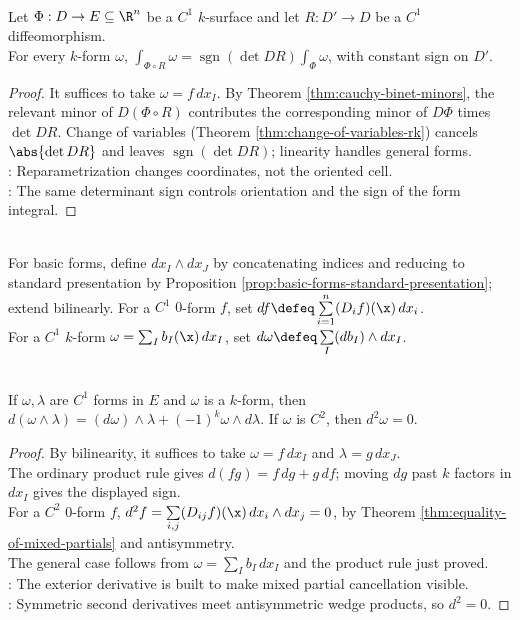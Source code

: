 \begin{theorem} \label{thm:forms-reparametrization-naturality} \\
Let $\Phi:D\to E\subseteq\R^n$ be a $C^1$ $k$-surface and let $R:D'\to D$ be a $C^1$ diffeomorphism.\\
For every $k$-form $\omega$, $\int_{\Phi\circ R}\omega=\operatorname{sgn}(\det DR)\int_{\Phi}\omega$, with constant sign on $D'$.
\begin{proof}
It suffices to take $\omega=f\,dx_I$. By Theorem \ref{thm:cauchy-binet-minors}, the relevant minor of $D(\Phi\circ R)$ contributes the corresponding minor of $D\Phi$ times $\det DR$. Change of variables (Theorem \ref{thm:change-of-variables-rk}) cancels $\abs{\det DR}$ and leaves $\operatorname{sgn}(\det DR)$; linearity handles general forms.\\
: Reparametrization changes coordinates, not the oriented cell.\\
: The same determinant sign controls orientation and the sign of the form integral.
\end{proof}
\end{theorem}

\begin{definition} \label{def:wedge-product-and-exterior-derivative} \\
For basic forms, define $dx_I\wedge dx_J$ by concatenating indices and reducing to standard presentation by Proposition \ref{prop:basic-forms-standard-presentation}; extend bilinearly. For a $C^1$ $0$-form $f$, set $df\defeq\sum\limits_{i=1}^{n}(D_if)(\x)\,dx_i$.\\
For a $C^1$ $k$-form $\omega=\sum_I b_I(\x)\,dx_I$, set $d\omega\defeq\sum\limits_I (db_I)\wedge dx_I$.
\end{definition}

\begin{theorem} \label{thm:exterior-derivative-basic-laws} \\
If $\omega,\lambda$ are $C^1$ forms in $E$ and $\omega$ is a $k$-form, then $d(\omega\wedge\lambda)=(d\omega)\wedge\lambda+(-1)^k\omega\wedge d\lambda$. If $\omega$ is $C^2$, then $d^2\omega=0$.
\begin{proof}
By bilinearity, it suffices to take $\omega=f\,dx_I$ and $\lambda=g\,dx_J$.\\
The ordinary product rule gives $d(fg)=f\,dg+g\,df$; moving $dg$ past $k$ factors in $dx_I$ gives the displayed sign.\\
For a $C^2$ $0$-form $f$, $d^2f=\sum\limits_{i,j}(D_{ij}f)(\x)\,dx_i\wedge dx_j=0$, by Theorem \ref{thm:equality-of-mixed-partials} and antisymmetry.\\
The general case follows from $\omega=\sum_I b_I\,dx_I$ and the product rule just proved.\\
: The exterior derivative is built to make mixed partial cancellation visible.\\
: Symmetric second derivatives meet antisymmetric wedge products, so $d^2=0$.
\end{proof}
\end{theorem}

